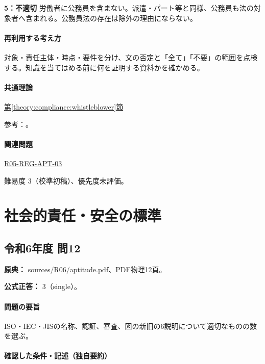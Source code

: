 \noindent\textbf{5：不適切} 労働者に公務員を含まない。派遣・パート等と同様、公務員も法の対象者へ含まれる。公務員法の存在は除外の理由にならない。\par

\paragraph{再利用する考え方} 対象・責任主体・時点・要件を分け、文の否定と「全て」「不要」の範囲を点検する。知識を当てはめる前に何を証明する資料かを確かめる。

\paragraph{共通理論} \hyperref[theory:compliance:whistleblower]{第\ref*{theory:compliance:whistleblower}節}

\par 参考：\cite{caa_amend2020,caa_current_faq,saf53_whistle_oldpublic}。

\paragraph{関連問題} \hyperref[q:r05-reg-apt-03]{R05-REG-APT-03}

\par 難易度 3（校準初稿）、優先度未評価。

\section{社会的責任・安全の標準}

\subsection{令和6年度 問12}
\label{q:r06-reg-apt-12}

\noindent\textbf{原典：} sources/R06/aptitude.pdf、PDF物理12頁。

\textbf{公式正答：} 3（single）。

\paragraph{問題の要旨} ISO・IEC・JISの名称、認証、審査、図の新旧の6説明について適切なものの数を選ぶ。

\paragraph{確認した条件・記述（独自要約）}\mbox{}\par

